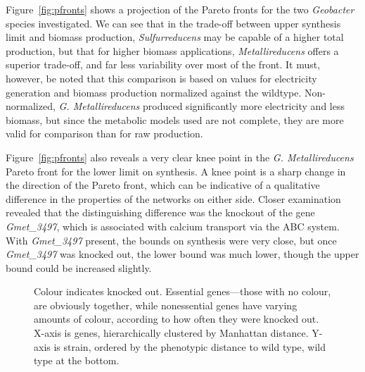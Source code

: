 \documentclass[a4paper]{article}
\begin{document}
Figure~\ref{fig:pfronts} shows a projection of the Pareto fronts for the two {\it Geobacter} species investigated. We can see that in the trade-off between upper synthesis limit and biomass production, {\it Sulfurreducens} may be capable of a higher total production, but that for higher biomass applications, {\it Metallireducens }offers a superior trade-off, and far less variability over most of the front. It must, however, be noted that this comparison is based on values for electricity generation and biomass production normalized against the wildtype. Non-normalized, {\it G. Metallireducens} produced significantly more electricity and less biomass, but since the metabolic models used are not complete, they are more valid for comparison than for raw production.

Figure~\ref{fig:pfronts} also reveals a very clear knee point in the {\it G. Metallireducens} Pareto front for the lower limit on synthesis. A knee point is a sharp change in the direction of the Pareto front, which can be indicative of a qualitative difference in the properties of the networks on either side. Closer examination revealed that the distinguishing difference was the knockout of the gene {\it Gmet\_3497}, which is associated with calcium transport via the ABC system. With {\it Gmet\_3497} present, the bounds on synthesis were very close, but once {\it Gmet\_3497} was knocked out, the lower bound was much lower, though the upper bound could be increased slightly.

\begin{figure}[!htb]
\caption{Colour indicates knocked out. Essential genes---those with no colour, are obviously together, while nonessential genes have varying amounts of colour, according to how often they were knocked out. X-axis is genes, hierarchically clustered by Manhattan distance. Y-axis is strain, ordered by the phenotypic distance to wild type, wild type at the bottom. \label{fig:heatmap}} 
\end{figure}
\end{document}

